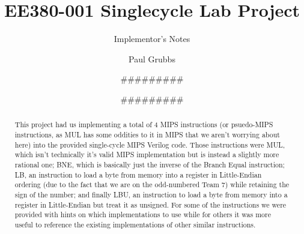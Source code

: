 \documentclass[acmtog]{acmart}
\begin{document}

\title{EE380-001 Singlecycle Lab Project}
\subtitle{Implementor's Notes}

\author{Paul Grubbs}
\author{\#\#\#\#\#\#\#\#\#}
\author{\#\#\#\#\#\#\#\#\#}

\begin{abstract}
  This project had us implementing a total of 4 MIPS instructions (or psuedo-MIPS instructions, as MUL has some oddities to it in MIPS that we aren't worrying about here)
  into the provided single-cycle MIPS Verilog code. Those instructions were MUL, which isn't technically it's valid MIPS implementation but is instead a slightly more 
  rational one; BNE, which is basically just the inverse of the Branch Equal instruction; LB, an instruction to load a byte from memory into a register in Little-Endian ordering
  (due to the fact that we are on the odd-numbered Team 7) while retaining the sign of the number; and finally LBU, an instruction to load a byte from memory into a register in 
  Little-Endian but treat it as unsigned. For some of the instructions we were provided with hints on which implementations to use while for others it was more useful to reference the 
  existing implementations of other similar instructions.
\end{abstract}

\maketitle
\end{document}
